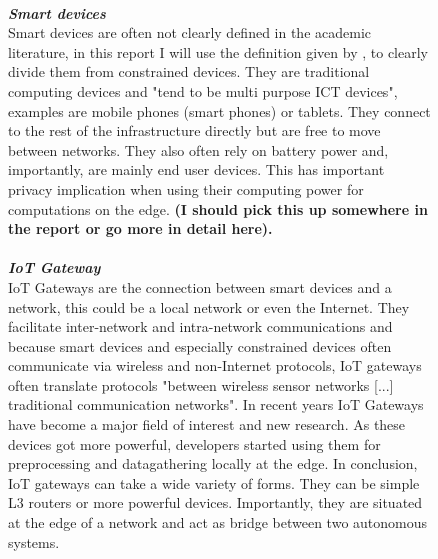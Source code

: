 \begin{figure}[h!]
\vspace{0.5mm}\\
\textbf{\textit{Smart devices}}\\
Smart devices are often not clearly defined in the academic literature, in this report I will use the definition given by \citeauthor{poslad2011smartDevices}\cite{poslad2011smartDevices}, to clearly divide them from constrained devices. They are traditional computing devices and "tend to be multi purpose ICT devices"\cite{poslad2011smartDevices}, examples are mobile phones (smart phones) or tablets. They connect to the rest of the infrastructure directly but are free to move between networks. They also often rely on battery power and, importantly, are mainly end user devices. This has important privacy implication when using their computing power for computations on the edge. \textbf{(I should pick this up somewhere in the report or go more in detail here).}\\

\vspace{0.5mm}\\
\textbf{\textit{IoT Gateway}}\\
IoT Gateways are the connection between smart devices and a network, this could be a local network or even the Internet. They facilitate inter-network and intra-network communications and because smart devices and especially constrained devices often communicate via wireless and non-Internet protocols, IoT gateways often translate protocols "between wireless sensor networks [...] traditional communication networks"\cite{zhu2010iotGatewayDefinition}.
In recent years IoT Gateways have become a major field of interest and new research. As these devices got more powerful, developers started using them for preprocessing and datagathering locally at the edge.
In conclusion, IoT gateways can take a wide variety of forms. They can be simple L3 routers or more powerful devices. Importantly, they are situated at the edge of a network and act as bridge between two autonomous systems.



\end{figure}
